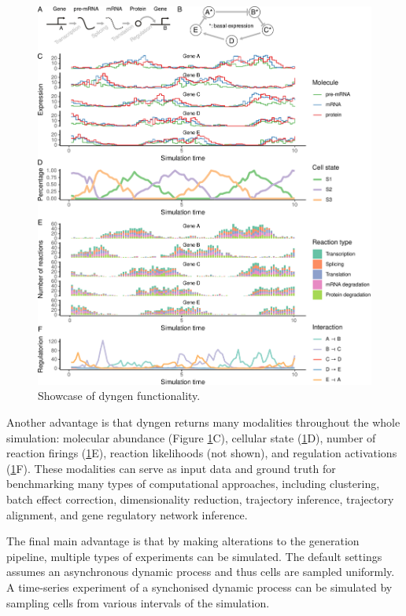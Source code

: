 \begin{figure}
	\centering
	\includegraphics[width=\linewidth]{fig/dyngen/simplecyclic_edited} 
	\caption{Showcase of dyngen functionality.}
	\label{fig:simplecyclic}
\end{figure}

Another advantage is that dyngen returns many modalities throughout the whole simulation: molecular abundance (Figure \ref{fig:simplecyclic}C), cellular state (\ref{fig:simplecyclic}D), number of reaction firings (\ref{fig:simplecyclic}E), reaction likelihoods (not shown), and regulation activations (\ref{fig:simplecyclic}F). These modalities can serve as input data and ground truth for benchmarking many types of computational approaches, including clustering, batch effect correction, dimensionality reduction, trajectory inference, trajectory alignment, and gene regulatory network inference. 

The final main advantage is that by making alterations to the generation pipeline, multiple types of experiments can be simulated. The default settings assumes an asynchronous dynamic process and thus cells are sampled uniformly. A time-series experiment of a synchonised dynamic process can be simulated by sampling cells from various intervals of the simulation. 

